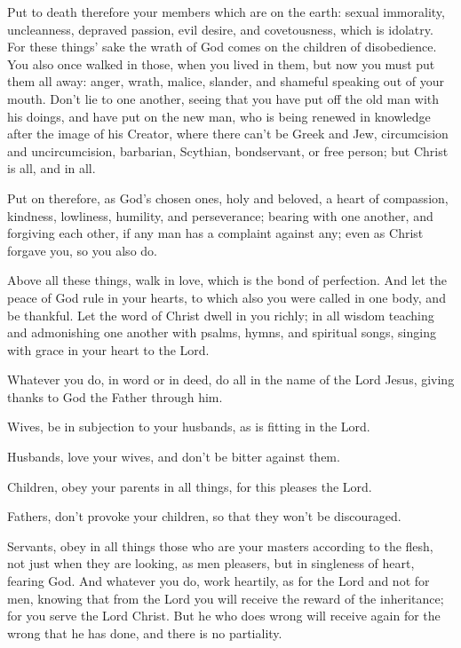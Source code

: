  Put to death therefore your members which are on the
earth: sexual immorality, uncleanness, depraved passion, evil desire,
and covetousness, which is idolatry.  For these things'
sake the wrath of God comes on the children of disobedience.
 You also once walked in those, when you lived in them,
 but now you must put them all away: anger, wrath, malice,
slander, and shameful speaking out of your mouth.  Don't
lie to one another, seeing that you have put off the old man with his
doings,  and have put on the new man, who is being
renewed in knowledge after the image of his Creator, 
where there can't be Greek and Jew, circumcision and uncircumcision,
barbarian, Scythian, bondservant, or free person; but Christ is all, and
in all.

 Put on therefore, as God's chosen ones, holy and
beloved, a heart of compassion, kindness, lowliness, humility, and
perseverance;  bearing with one another, and forgiving
each other, if any man has a complaint against any; even as Christ
forgave you, so you also do.

 Above all these things, walk in love, which is the bond
of perfection.  And let the peace of God rule in your
hearts, to which also you were called in one body, and be thankful.
 Let the word of Christ dwell in you richly; in all
wisdom teaching and admonishing one another with psalms, hymns, and
spiritual songs, singing with grace in your heart to the Lord.

 Whatever you do, in word or in deed, do all in the name
of the Lord Jesus, giving thanks to God the Father through him.

 Wives, be in subjection to your husbands, as is fitting
in the Lord.

 Husbands, love your wives, and don't be bitter against
them.

 Children, obey your parents in all things, for this
pleases the Lord.

 Fathers, don't provoke your children, so that they won't
be discouraged.

 Servants, obey in all things those who are your masters
according to the flesh, not just when they are looking, as men pleasers,
but in singleness of heart, fearing God.  And whatever
you do, work heartily, as for the Lord and not for men, 
knowing that from the Lord you will receive the reward of the
inheritance; for you serve the Lord Christ.  But he who
does wrong will receive again for the wrong that he has done, and there
is no partiality.

